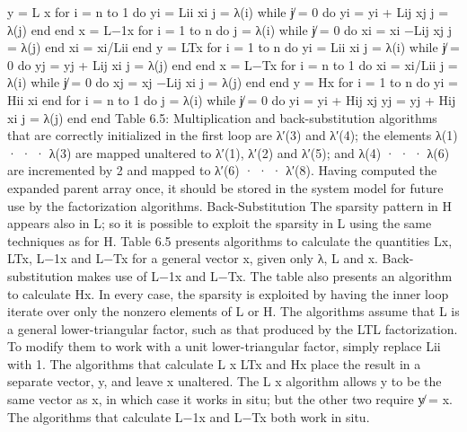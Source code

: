 y = L x for i = n to 1 do yi = Lii xi j = λ(i) while j̸ = 0 do yi = yi + Lij xj j = λ(j) end end x = L−1x for i = 1 to n do j = λ(i) while j̸ = 0 do xi = xi −Lij xj j = λ(j) end xi = xi/Lii end y = LTx for i = 1 to n do yi = Lii xi j = λ(i) while j̸ = 0 do yj = yj + Lij xi j = λ(j) end end x = L−Tx for i = n to 1 do xi = xi/Lii j = λ(i) while j̸ = 0 do xj = xj −Lij xi j = λ(j) end end y = Hx for i = 1 to n do yi = Hii xi end for i = n to 1 do j = λ(i) while j̸ = 0 do yi = yi + Hij xj yj = yj + Hij xi j = λ(j) end end Table 6.5: Multiplication and back-substitution algorithms that are correctly initialized in the first loop are λ′(3) and λ′(4); the elements λ(1) · · · λ(3) are mapped unaltered to λ′(1), λ′(2) and λ′(5); and λ(4) · · · λ(6) are incremented by 2 and mapped to λ′(6) · · · λ′(8). Having computed the expanded parent array once, it should be stored in the system model for future use by the factorization algorithms. Back-Substitution The sparsity pattern in H appears also in L; so it is possible to exploit the sparsity in L using the same techniques as for H. Table 6.5 presents algorithms to calculate the quantities Lx, LTx, L−1x and L−Tx for a general vector x, given only λ, L and x. Back-substitution makes use of L−1x and L−Tx. The table also presents an algorithm to calculate Hx. In every case, the sparsity is exploited by having the inner loop iterate over only the nonzero elements of L or H. The algorithms assume that L is a general lower-triangular factor, such as that produced by the LTL factorization. To modify them to work with a unit lower-triangular factor, simply replace Lii with 1. The algorithms that calculate L x LTx and Hx place the result in a separate vector, y, and leave x unaltered. The L x algorithm allows y to be the same vector as x, in which case it works in situ; but the other two require y̸ = x. The algorithms that calculate L−1x and L−Tx both work in situ.

